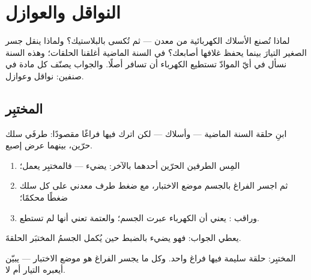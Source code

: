 \chapter{النواقل والعوازل}\label{ch:g4:conductors-insulators}

لماذا تُصنع الأسلاك الكهربائية من معدن --- ثم تُكسى بالبلاستيك؟
ولماذا ينقل جسر  الصغير التيارَ بينما يحفظ غلافها أصابعك؟
في السنة الماضية أغلقنا الحلقات؛ وهذه السنة نسأل في أيّ الموادّ
تستطيع الكهرباء أن تسافر أصلًا. والجواب يصنّف كل مادة في صنفين:
نواقل وعوازل.

\section{المختبِر}

\begin{method}\label{met:g4:conductors-insulators:tester}
ابنِ حلقة السنة الماضية ---  وأسلاك  --- لكن اترك
فيها فراغًا مقصودًا: طرفَي سلك حرّين، بينهما عرض إصبع.
\begin{enumerate}
  \item المِس الطرفين الحرّين أحدهما بالآخر: يضيء  ---
        فالمختبِر يعمل؛
  \item ثم اجسر الفراغ بالجسم موضع الاختبار، مع ضغط طرف معدني
        على كل سلك ضغطًا محكمًا؛
  \item وراقب :  يعني أن الكهرباء عبرت الجسم؛
        والعتمة تعني أنها لم تستطع.
\end{enumerate}
 يعطي الجواب: فهو يضيء بالضبط حين يُكمل الجسمُ المختبَر
الحلقةَ.
\end{method}

\begin{omfigure}

{\small المختبِر: حلقة سليمة فيها فراغ واحد. وكل ما يجسر الفراغ
هو موضع الاختبار ---  يبيّن أيعبره التيار أم لا.}
\end{omfigure}

